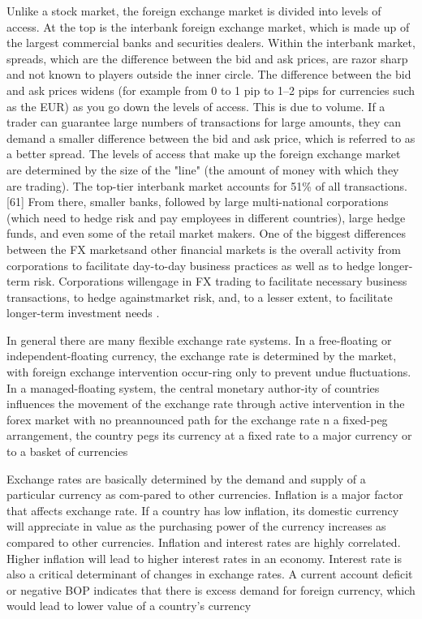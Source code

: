 Unlike a stock market, the foreign exchange market is divided into levels of access. At the top is the interbank foreign exchange market, which is made up of the largest commercial banks and securities dealers. Within the interbank market, spreads, which are the difference between the bid and ask prices, are razor sharp and not known to players outside the inner circle. The difference between the bid and ask prices widens (for example from 0 to 1 pip to 1–2 pips for currencies such as the EUR) as you go down the levels of access. This is due to volume. If a trader can guarantee large numbers of transactions for large amounts, they can demand a smaller difference between the bid and ask price, which is referred to as a better spread. The levels of access that make up the foreign exchange market are determined by the size of the "line" (the amount of money with which they are trading). The top-tier interbank market accounts for 51\% of all transactions.[61] From there, smaller banks, followed by large multi-national corporations (which need to hedge risk and pay employees in different countries), large hedge funds, and even some of the retail market makers.
One of the biggest differences between the FX marketsand other financial markets is the overall activity from corporations to facilitate day-to-day business practices as well as to hedge longer-term risk. Corporations willengage in FX trading to facilitate necessary business transactions, to hedge againstmarket risk, and, to a lesser extent, to facilitate longer-term investment needs \cite{book_forex_3}.

In general there are many flexible exchange rate systems. In a free-floating or independent-floating currency,  the  exchange  rate  is  determined  by  the  market,  with  foreign  exchange  intervention  occur-ring only to prevent undue fluctuations. In a managed-floating system, the central monetary author-ity of countries influences the movement of the exchange rate through active intervention in the forex market with no preannounced path for the exchange rate n a fixed-peg arrangement, the country pegs its currency at a fixed rate to a major currency or to a basket of currencies \cite{book_forex}

Exchange rates are basically determined by the demand and supply of a particular currency as com-pared to other currencies. Inflation is a major factor that affects exchange rate. If a country has low inflation, its domestic currency will appreciate in value as the purchasing power of the currency increases as  compared  to  other  currencies.  Inflation  and  interest  rates  are  highly  correlated.  Higher  inflation  will lead to higher interest rates in an economy. Interest rate is also a critical determinant of changes in exchange rates. A current account deficit or negative BOP indicates that there is excess demand for foreign currency, which would lead to lower value of a country’s currency \cite{book_forex}

